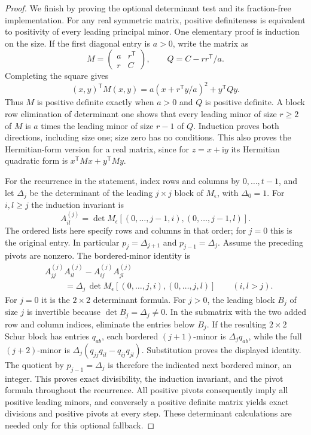 \begin{proof}
We finish by proving the optional determinant test and its
fraction-free implementation.  For any real symmetric matrix,
positive definiteness is equivalent to positivity of every
leading principal minor.  One elementary proof is induction on
the size.  If the first diagonal entry is \(a>0\), write the
matrix as
\[
 M=\begin{pmatrix}a&r^{\mathsf T}\\r&C\end{pmatrix},
 \qquad Q=C-rr^{\mathsf T}/a.
\]
Completing the square gives
\[
 (x,y)^{\mathsf T}M(x,y)
       =a(x+r^{\mathsf T}y/a)^2+y^{\mathsf T}Qy.
\]
Thus \(M\) is positive definite exactly when \(a>0\) and \(Q\)
is positive definite.  A block row elimination of determinant
one shows that every leading minor of size \(r\ge2\) of \(M\)
is \(a\) times the leading minor of size \(r-1\) of \(Q\).
Induction proves both directions, including size one; size zero
has no conditions.  This also proves the Hermitian-form version
for a real matrix, since for \(z=x+\mathrm i y\) its Hermitian
quadratic form is \(x^{\mathsf T}Mx+y^{\mathsf T}My\).

For the recurrence in the statement, index rows and columns
by \(0,\ldots,t-1\), and let \(\Delta_j\) be the determinant
of the leading \(j\times j\) block of \(M_\epsilon\), with
\(\Delta_0=1\).  For \(i,l\ge j\) the induction invariant is
\[
 A^{(j)}_{il}=
  \det M_\epsilon[(0,\ldots,j-1,i),(0,\ldots,j-1,l)].
\]
The ordered lists here specify rows and columns in that order;
for \(j=0\) this is the original entry.  In particular
\(p_j=\Delta_{j+1}\) and \(p_{j-1}=\Delta_j\).
Assume the preceding pivots are nonzero.  The bordered-minor
identity is
\begin{align*}
 &A^{(j)}_{jj}A^{(j)}_{il}
                    -A^{(j)}_{ij}A^{(j)}_{jl}\\
 &\hspace{1cm}=\Delta_j\,
  \det M_\epsilon[(0,\ldots,j,i),(0,\ldots,j,l)]
                       \qquad(i,l>j).
\end{align*}
For \(j=0\) it is the \(2\times2\) determinant formula.  For
\(j>0\), the leading block \(B_j\) of size \(j\) is invertible
because \(\det B_j=\Delta_j\ne0\).  In the submatrix with the
two added row and column indices, eliminate the entries below
\(B_j\).  If the resulting \(2\times2\) Schur block has entries
\(q_{ab}\), each bordered \((j+1)\)-minor is
\(\Delta_j q_{ab}\), while the full \((j+2)\)-minor is
\(\Delta_j(q_{jj}q_{il}-q_{ij}q_{jl})\).
Substitution proves the displayed identity.  The quotient by
\(p_{j-1}=\Delta_j\) is therefore the indicated next bordered
minor, an integer.  This proves exact divisibility, the induction
invariant, and the pivot formula throughout the recurrence.
All positive pivots consequently imply all positive leading
minors, and conversely a positive definite matrix yields exact
divisions and positive pivots at every step.  These determinant
calculations are needed only for this optional fallback.
\end{proof}

